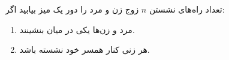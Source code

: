 تعداد راه‌های نشستن $n$ 
زوج زن و مرد را دور یک میز بیابید اگر:
\begin{enumerate}
  \item 
    مرد و زن‌ها یکی در میان بنشینند.

  \item 
    هر زنی کنار همسر خود نشسته باشد.
\end{enumerate}